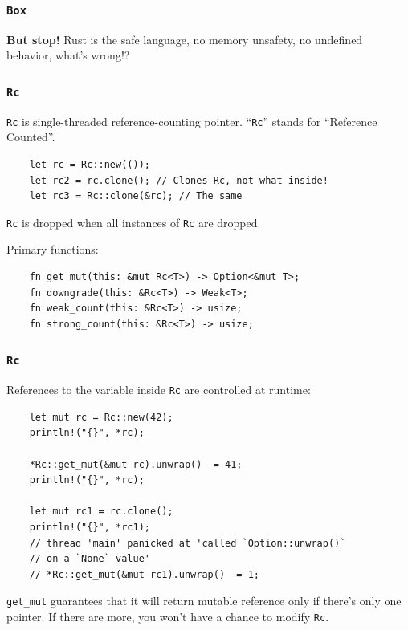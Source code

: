 \documentclass[aspectratio=1610,t]{beamer}
\begin{document}
\begin{frame}[fragile]
\frametitle{\texttt{Box}}
\textbf{But stop!} Rust is the safe language, no memory unsafety, no undefined behavior, what's wrong!?

\end{frame}


\begin{frame}[fragile]
\frametitle{\texttt{Rc}}
\texttt{Rc} is single-threaded reference-counting pointer. ``\texttt{Rc}'' stands for ``Reference Counted''.

\begin{verbatim}
    let rc = Rc::new(());
    let rc2 = rc.clone(); // Clones Rc, not what inside!
    let rc3 = Rc::clone(&rc); // The same
\end{verbatim}

\texttt{Rc} is dropped when all instances of \texttt{Rc} are dropped.

Primary functions:

\begin{verbatim}
    fn get_mut(this: &mut Rc<T>) -> Option<&mut T>;
    fn downgrade(this: &Rc<T>) -> Weak<T>;
    fn weak_count(this: &Rc<T>) -> usize;
    fn strong_count(this: &Rc<T>) -> usize;
\end{verbatim}
\end{frame}


\begin{frame}[fragile]
\frametitle{\texttt{Rc}}
References to the variable inside \texttt{Rc} are controlled at runtime:

\begin{verbatim}
    let mut rc = Rc::new(42);
    println!("{}", *rc);

    *Rc::get_mut(&mut rc).unwrap() -= 41;
    println!("{}", *rc);

    let mut rc1 = rc.clone();
    println!("{}", *rc1);
    // thread 'main' panicked at 'called `Option::unwrap()`
    // on a `None` value'
    // *Rc::get_mut(&mut rc1).unwrap() -= 1;
\end{verbatim}

\texttt{get\_mut} guarantees that it will return mutable reference only if there's only one pointer. If there are more, you won't have a chance to modify \texttt{Rc}.
\end{frame}
\end{document}
